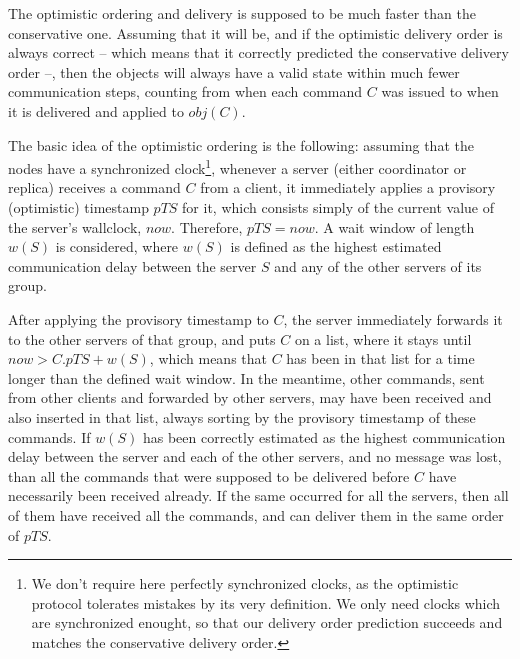 \documentclass[times, 10pt]{article}
\begin{document}
The optimistic ordering and delivery is supposed to be much faster than the conservative one. Assuming that it will be, and if the optimistic delivery order is always correct -- which means that it correctly predicted the conservative delivery order --, then the objects will always have a valid state within much fewer communication steps, counting from when each command $C$ was issued to when it is delivered and applied to $obj(C)$.

The basic idea of the optimistic ordering is the following: assuming that the nodes have a synchronized clock\footnote{We don't require here perfectly synchronized clocks, as the optimistic protocol tolerates mistakes by its very definition. We only need clocks which are synchronized enought, so that our delivery order prediction succeeds and matches the conservative delivery order.}, whenever a server (either coordinator or replica) receives a command $C$ from a client, it immediately applies a provisory (optimistic) timestamp $pTS$ for it, which consists simply of the current value of the server's wallclock, $now$. Therefore, $pTS=now$. A wait window of length $w(S)$ is considered, where $w(S)$ is defined as the highest estimated communication delay between the server $S$ and any of the other servers of its group.

After applying the provisory timestamp to $C$, the server immediately forwards it to the other servers of that group, and puts $C$ on a list, where it stays until $now>C.pTS+w(S)$, which means that $C$ has been in that list for a time longer than the defined wait window. In the meantime, other commands, sent from other clients and forwarded by other servers, may have been received and also inserted in that list, always sorting by the provisory timestamp of these commands. If $w(S)$ has been correctly estimated as the highest communication delay between the server and each of the other servers, and no message was lost, than all the commands that were supposed to be delivered before $C$ have necessarily been received already. If the same occurred for all the servers, then all of them have received all the commands, and can deliver them in the same order of $pTS$.
\end{document}
